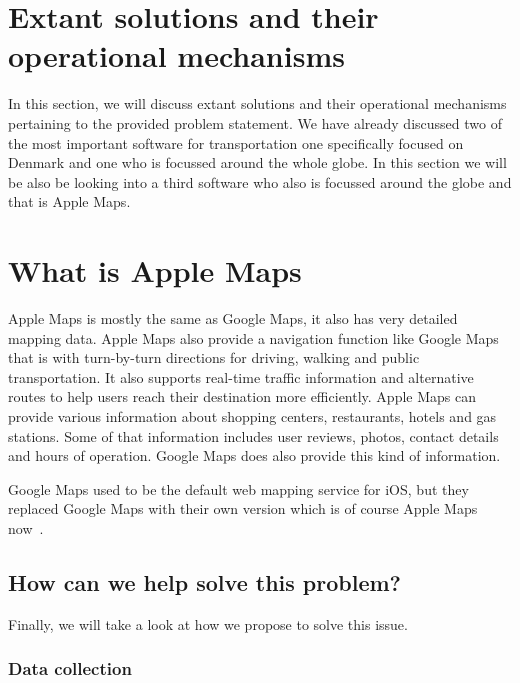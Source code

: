 \section{Extant solutions and their operational mechanisms}\label{sec:extant-solutions-and-their-operational-mechanisms}

In this section, we will discuss extant solutions and their operational mechanisms pertaining to the provided problem
statement.
We have already discussed two of the most important software for transportation one specifically focused on Denmark and
one who is focussed around the whole globe.
In this section we will be also be looking into a third software who also is focussed around the globe and that is
Apple Maps.



\section{What is Apple Maps}\label{sec:what-is-apple-maps}
Apple Maps is mostly the same as Google Maps, it also has very detailed mapping data.
Apple Maps also provide a navigation function like Google Maps that is with turn-by-turn directions for driving, walking
and public transportation.
It also supports real-time traffic information and alternative routes to help users reach their destination more
efficiently.
Apple Maps can provide various information about shopping centers, restaurants, hotels and gas stations.
Some of that information includes user reviews, photos, contact details and hours of operation.
Google Maps does also provide this kind of information.

Google Maps used to be the default web mapping service for iOS, but they replaced Google Maps with their own version
which is of course Apple Maps now~\cite{applemaps2023}.

\subsection{How can we help solve this problem?}\label{subsec:how-can-we-help-solve-this-problem?}

Finally, we will take a look at how we propose to solve this issue.

\subsubsection{Data collection}

